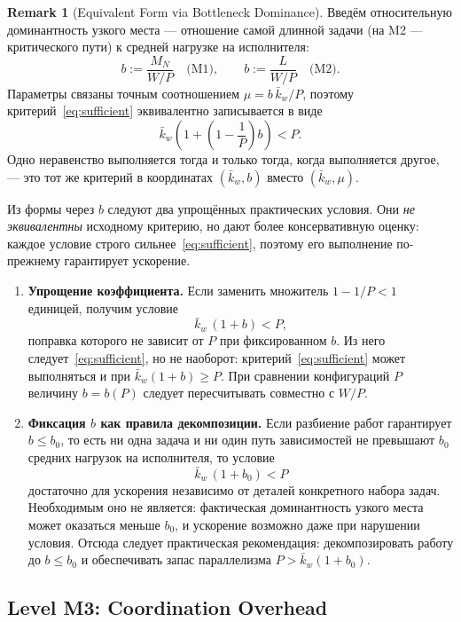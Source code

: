 \documentclass[12pt,a4paper]{article}
\theoremstyle{definition}
\newtheorem{remark}{Remark}
\begin{document}
\begin{remark}[Equivalent Form via Bottleneck Dominance]\label{rem:dominance}
Введём относительную доминантность узкого места --- отношение самой длинной задачи (на M2 --- критического пути) к средней нагрузке на исполнителя:
\[
  b := \frac{M_N}{W/P} \quad \text{(M1)}, \qquad b := \frac{L}{W/P} \quad \text{(M2)}.
\]
Параметры связаны точным соотношением $\mu = b\,\bar{k}_w/P$, поэтому критерий~\eqref{eq:sufficient} эквивалентно записывается в виде
\[
  \bar{k}_w \left(1 + \left(1 - \frac{1}{P}\right)b\right) < P.
\]
Одно неравенство выполняется тогда и только тогда, когда выполняется другое, --- это тот же критерий в координатах $(\bar{k}_w, b)$ вместо $(\bar{k}_w, \mu)$.

Из формы через $b$ следуют два упрощённых практических условия. Они \emph{не эквивалентны} исходному критерию, но дают более консервативную оценку: каждое условие строго сильнее~\eqref{eq:sufficient}, поэтому его выполнение по-прежнему гарантирует ускорение.
\begin{enumerate}
  \item \textbf{Упрощение коэффициента.} Если заменить множитель $1 - 1/P < 1$ единицей, получим условие
  \[
    \bar{k}_w\,(1 + b) < P,
  \]
  поправка которого не зависит от $P$ при фиксированном $b$. Из него следует~\eqref{eq:sufficient}, но не наоборот: критерий~\eqref{eq:sufficient} может выполняться и при $\bar{k}_w(1+b) \ge P$. При сравнении конфигураций $P$ величину $b=b(P)$ следует пересчитывать совместно с $W/P$.
  \item \textbf{Фиксация $b$ как правила декомпозиции.} Если разбиение работ гарантирует $b \le b_0$, то есть ни одна задача и ни один путь зависимостей не превышают $b_0$ средних нагрузок на исполнителя, то условие
  \[
    \bar{k}_w\,(1 + b_0) < P
  \]
  достаточно для ускорения независимо от деталей конкретного набора задач. Необходимым оно не является: фактическая доминантность узкого места может оказаться меньше $b_0$, и ускорение возможно даже при нарушении условия. Отсюда следует практическая рекомендация: декомпозировать работу до $b \le b_0$ и обеспечивать запас параллелизма $P > \bar{k}_w(1 + b_0)$.
\end{enumerate}
\end{remark}

\subsection{Level M3: Coordination Overhead}
\end{document}
